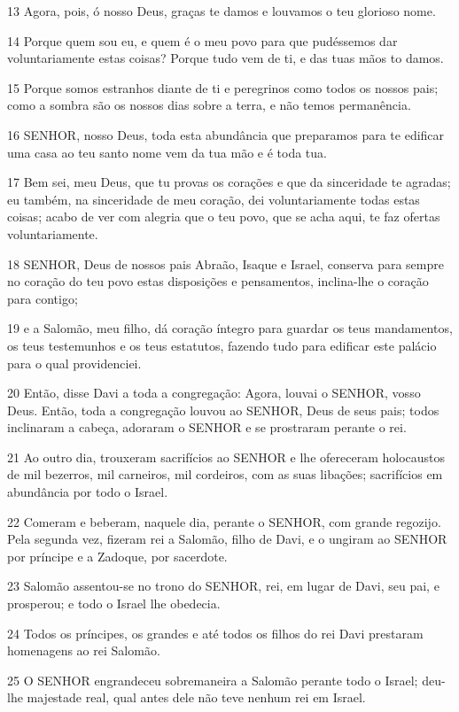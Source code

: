 \par 13 Agora, pois, ó nosso Deus, graças te damos e louvamos o teu glorioso nome.
\par 14 Porque quem sou eu, e quem é o meu povo para que pudéssemos dar voluntariamente estas coisas? Porque tudo vem de ti, e das tuas mãos to damos.
\par 15 Porque somos estranhos diante de ti e peregrinos como todos os nossos pais; como a sombra são os nossos dias sobre a terra, e não temos permanência.
\par 16 SENHOR, nosso Deus, toda esta abundância que preparamos para te edificar uma casa ao teu santo nome vem da tua mão e é toda tua.
\par 17 Bem sei, meu Deus, que tu provas os corações e que da sinceridade te agradas; eu também, na sinceridade de meu coração, dei voluntariamente todas estas coisas; acabo de ver com alegria que o teu povo, que se acha aqui, te faz ofertas voluntariamente.
\par 18 SENHOR, Deus de nossos pais Abraão, Isaque e Israel, conserva para sempre no coração do teu povo estas disposições e pensamentos, inclina-lhe o coração para contigo;
\par 19 e a Salomão, meu filho, dá coração íntegro para guardar os teus mandamentos, os teus testemunhos e os teus estatutos, fazendo tudo para edificar este palácio para o qual providenciei.
\par 20 Então, disse Davi a toda a congregação: Agora, louvai o SENHOR, vosso Deus. Então, toda a congregação louvou ao SENHOR, Deus de seus pais; todos inclinaram a cabeça, adoraram o SENHOR e se prostraram perante o rei.
\par 21 Ao outro dia, trouxeram sacrifícios ao SENHOR e lhe ofereceram holocaustos de mil bezerros, mil carneiros, mil cordeiros, com as suas libações; sacrifícios em abundância por todo o Israel.
\par 22 Comeram e beberam, naquele dia, perante o SENHOR, com grande regozijo. Pela segunda vez, fizeram rei a Salomão, filho de Davi, e o ungiram ao SENHOR por príncipe e a Zadoque, por sacerdote.
\par 23 Salomão assentou-se no trono do SENHOR, rei, em lugar de Davi, seu pai, e prosperou; e todo o Israel lhe obedecia.
\par 24 Todos os príncipes, os grandes e até todos os filhos do rei Davi prestaram homenagens ao rei Salomão.
\par 25 O SENHOR engrandeceu sobremaneira a Salomão perante todo o Israel; deu-lhe majestade real, qual antes dele não teve nenhum rei em Israel.
